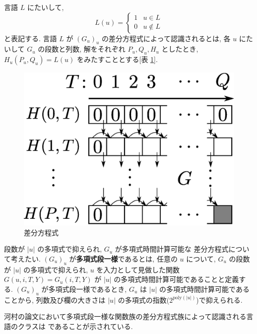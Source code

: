  言語 $L$ にたいして, 
 \begin{equation}
	L(u) = \begin{cases} 
	       1 & u \in L \\
	       0 & u \not \in L 
	       \end{cases}
 \end{equation}
 と表記する.
 言語 $L$ が $(G_u)_u$ の差分方程式によって認識されるとは,
 各 $u$ にたいして $G_u$ の段数と列数, 解をそれぞれ $P_u, Q_u, H_u$ としたとき,
 $H_u(P_u, Q_u) = L(u)$ をみたすこととする[表 \ref{fig:divp}].



 \begin{figure}
  \label{fig:divp}
  \begin{center}
   \includegraphics[height=0.2\textheight]{image/divp.eps}
  \end{center}
  \caption{差分方程式}
 \end{figure}



 段数が $|u|$ の多項式で抑えられ, $G_u$ が多項式時間計算可能な
 差分方程式について考えたい.
 $(G_u)_u$ が{\bf 多項式段一様}であるとは,
 任意の $u$ について,
 $G_u$ の段数が $|u|$ の多項式で抑えられ, 
 $u$ を入力として見做した関数 $G(u, i, T, Y) = G_u(i, T, Y)$ が
 $|u|$ の多項式時間計算可能であることと定義する.
 $(G_u)_u$ が多項式段一様であるとき, $G_u$ は $|u|$ の多項式時間計算可能であることから,
 列数及び欄の大きさは $|u|$ の多項式の指数($2^{\mathrm{poly} (|u|)}$)で抑えられる.
 


 河村の論文において多項式段一様な関数族の差分方程式族によって認識される言語のクラスは
 \PSPACE であることが示されている.


